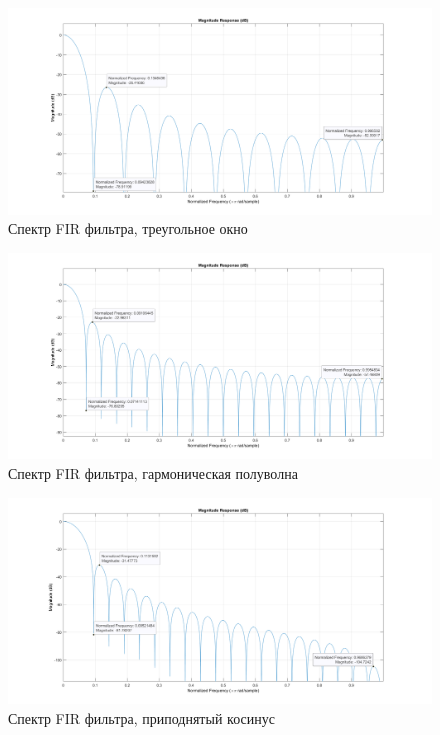 \documentclass[12pt,a4paper]{article}
\begin{document}
	\begin{figure}[H]
		\centering
		\includegraphics[width=1.0\linewidth]{res/4_5_N20_t.png}
		\caption{Спектр FIR фильтра, треугольное окно}
	\end{figure}
	
	\begin{figure}[H]
		\centering
		\includegraphics[width=1.0\linewidth]{res/4_5_N20_s.png}
		\caption{Спектр FIR фильтра, гармоническая полуволна}
	\end{figure}
	
	\begin{figure}[H]
		\centering
		\includegraphics[width=1.0\linewidth]{res/4_5_N20_c.png}
		\caption{Спектр FIR фильтра, приподнятый косинус}
	\end{figure}
	
\end{document}

